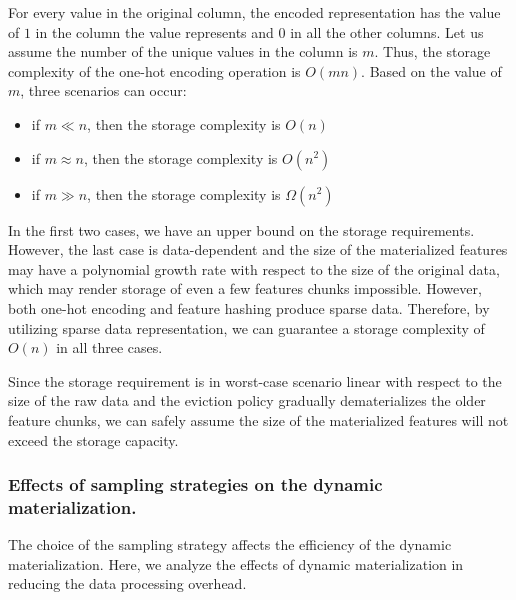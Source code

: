 For every value in the original column, the encoded representation has the value of $1$ in the column the value represents and $0$ in all the other columns.
Let us assume the number of the unique values in the column is $m$.
Thus, the storage complexity of the one-hot encoding operation is $O(mn)$.
Based on the value of $m$, three scenarios can occur:
\begin{itemize}
\item if $m \ll n$, then the storage complexity is $O(n)$
\item if $m \approx n$, then the storage complexity is $O(n^2)$
\item if $m \gg n$, then the storage complexity is $\Omega (n^2)$
\end{itemize}
In the first two cases, we have an upper bound on the storage requirements.
However, the last case is data-dependent and the size of the materialized features may have a polynomial growth rate with respect to the size of the original data, which may render storage of even a few features chunks impossible.
However, both one-hot encoding and feature hashing produce sparse data.
Therefore, by utilizing sparse data representation, we can guarantee a storage complexity of $O(n)$ in all three cases.

Since the storage requirement is in worst-case scenario linear with respect to the size of the raw data and the eviction policy gradually dematerializes the older feature chunks, we can safely assume the size of the materialized features will not exceed the storage capacity.

\subsubsection{Effects of sampling strategies on the dynamic materialization.}
The choice of the sampling strategy affects the efficiency of the dynamic materialization.
Here, we analyze the effects of dynamic materialization in reducing the data processing overhead.

